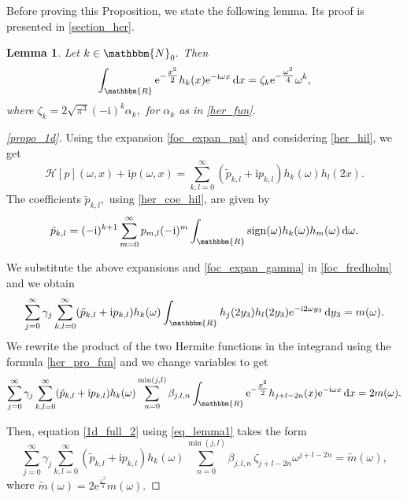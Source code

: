\documentclass[a4paper,twoside,10pt]{article}
\theoremstyle{break}
\newtheorem{lemma}{Lemma}[section]
\theoremstyle{nonumberplain}
\newtheorem{proof}{Proof}
\newcommand{\R}{\mathbbm{R}}
\newcommand{\N}{\mathbbm{N}}
\newcommand{\e}{\mathrm e}
\renewcommand{\i}{\mathrm i}
\renewcommand{\d}{\,\mathrm d}
\DeclareMathOperator{\sign}{sign}
\begin{document}
Before proving this Proposition, we state the following lemma. Its proof is presented in \autoref{section_her}.
\begin{lemma}\label{lemma1}
Let $k\in \N_0 .$ Then
\begin{equation}\label{eq_lemma1}
\int_\R \e^{-\tfrac{x^2}2} h_k (x) \e^{- \i \omega  x } \d x = \zeta_k \e^{-
\tfrac{\omega^2}4} \omega^k ,
\end{equation}
where $\zeta_k = 2\sqrt{\pi^3 } (-\i)^k \alpha_k ,$ for $\alpha_k$ as in \eqref{her_fun}.
\end{lemma}

\begin{proof}[\autoref{propo_1d}]
Using the expansion \eqref{foc_expan_pat} and considering \eqref{her_hil}, we get
\begin{equation*}%
\mathcal{H} [p] (\omega , x) + \i p (\omega , x) = \sum_{k,l=0}^\infty (\tilde p_{k,l} +\i p_{k,l} ) h_k (\omega) h_l (2x).
\end{equation*}
The coefficients $\tilde p_{k,l},$ using \eqref{her_coe_hil}, are given by
\begin{equation*}%
\tilde p_{k,l}  = (-\i)^{k+1} \sum_{m=0}^\infty p_{m,l} (-\i)^m \int_\R \sign (\omega) h_k (\omega) h_m (\omega) \d \omega .
\end{equation*}

We substitute the above expansions and \eqref{foc_expan_gamma} in \eqref{foc_fredholm} and we obtain 
\begin{equation*}%
\sum_{j=0}^\infty \gamma_j \sum_{k,l=0}^\infty (\tilde p_{k,l} +\i p_{k,l} ) h_k (\omega) \int_\R h_j (2y_3) h_l (2y_3) \e^{- \i 2\omega  y_3 } \d y_3 =  m (\omega) .
\end{equation*}
We rewrite the product of the two Hermite functions in the integrand using the formula \eqref{her_pro_fun} and we change variables to get
\begin{equation}\label{1d_full_2}
\sum_{j=0}^\infty \gamma_j \sum_{k,l=0}^\infty (\tilde p_{k,l} +\i p_{k,l} ) h_k (\omega) \sum_{n=0}^{\min (j,l)} \beta_{j,l,n}\int_\R \e^{-\tfrac{x^2}2} h_{j+l-2n} (x) \e^{- \i \omega  x } \d x = 2 m (\omega) .
\end{equation}


Then, equation \eqref{1d_full_2} using \eqref{eq_lemma1} takes the form
\begin{equation}\label{1d_full_3}
\sum_{j=0}^\infty \gamma_j \sum_{k,l=0}^\infty (\tilde p_{k,l} +\i p_{k,l} ) h_k (\omega) \sum_{n=0}^{\min (j,l)} \beta_{j,l,n} \,\zeta_{j+l-2n} \omega^{j+l-2n} = \tilde m (\omega) ,
\end{equation}
where $\tilde m (\omega )= 2 \e^{
\tfrac{\omega^2}4} m (\omega).$ 


\end{proof}
\end{document}
